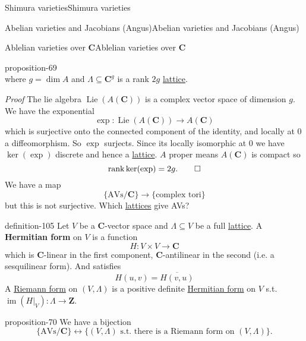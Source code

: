 \documentclass[10pt,]{book}
\makeatletter
\newcommand{\terminology}[1]{\textbf{#1}}
\renewcommand*{\proofname}{Proof}
\renewenvironment{proof}[1][\proofname]{\par
  \pushQED{\qed}%
  \normalfont \topsep6\p@\@plus6\p@\relax
  \trivlist
  \item\relax
    {\itshape
    #1\@addpunct{.}}\hspace\labelsep\ignorespaces
}{%
  \popQED\endtrivlist\@endpefalse
}
\numberwithin{equation}{section}
\newcommand{\Lie}{\operatorname{Lie}}
\newcommand{\ZZ}{\mathbf{Z}}
\newcommand{\CC}{\mathbf{C}}
\DeclareMathOperator{\rank}{rank}
\DeclareMathOperator{\im}{im}
\makeatother
\begin{document}
\begin{chapterptx}{Shimura varieties}{}{Shimura varieties}{}{}
\begin{sectionptx}{Abelian varieties and Jacobians (Angus)}{}{Abelian varieties and Jacobians (Angus)}{}{}
\begin{subsectionptx}{Ablelian varieties over \(\CC\)}{}{Ablelian varieties over \(\CC\)}{}{}
\begin{proposition}{}{}{proposition-69}
\begin{equation*}
\end{equation*}
where \(g = \dim A\) and \(\Lambda \subseteq \CC^g\) is a rank \(2g\) \hyperref[def-buntes-lattice]{lattice}.%
\end{proposition}
\begin{proof}\hypertarget{proof-111}{}
\hypertarget{p-1096}{}%
The lie algebra \(\Lie(A(\CC))\) is a complex vector space of dimension \(g\). We have the exponential%
\begin{equation*}
\exp \colon \Lie(A(\CC)) \to A(\CC)
\end{equation*}
which is surjective onto the connected component of the identity, and locally at \(0\) a diffeomorphism. So \(\exp\) surjects. Since its locally isomorphic at \(0\) we have \(\ker(\exp)\) discrete and hence a \hyperref[def-buntes-lattice]{lattice}. \(A \) proper means \(A(\CC)\) is compact so%
\begin{equation*}
\rank \ker (\exp) = 2g\text{.}\qedhere
\end{equation*}
%
\end{proof}
\hypertarget{p-1097}{}%
We have a map%
\begin{equation*}
\{\text{AVs}/\CC\} \to \{\text{complex tori}\}
\end{equation*}
but this is not surjective. Which \hyperref[def-buntes-lattice]{lattices} give AVs?%
\begin{definition}{}{definition-105}%
\hypertarget{p-1098}{}%
Let \(V\) be a \(\CC\)-vector space and \(\Lambda \subseteq V\) be a full \hyperref[def-buntes-lattice]{lattice}. A \terminology{Hermitian form} on \(V\) is a function%
\begin{equation*}
H \colon V\times V \to \CC
\end{equation*}
which is \(\CC\)-linear in the first component, \(\CC\)-antilinear in the second (i.e. a sesquilinear form). And satisfies%
\begin{equation*}
H(u,v) = \overline{H(v,u)}
\end{equation*}
A \hyperref[def-riemann-form]{Riemann form} on \((V,\Lambda)\) is a positive definite \hyperref[sec-buntes-av-jac]{Hermitian form} on \(V\) s.t. \(\im(H|_V) \colon \Lambda \to \ZZ\).%
\end{definition}
\begin{proposition}{}{}{proposition-70}%
\hypertarget{p-1099}{}%
We have a bijection%
\begin{equation*}
\{\text{AVs}/\CC\} \leftrightarrow \{(V,\Lambda)\text{ s.t. there is a Riemann form on } (V, \Lambda)\}\text{.}
\end{equation*}

\end{proposition}
\end{subsectionptx}
\end{sectionptx}
\end{chapterptx}
\end{document}
